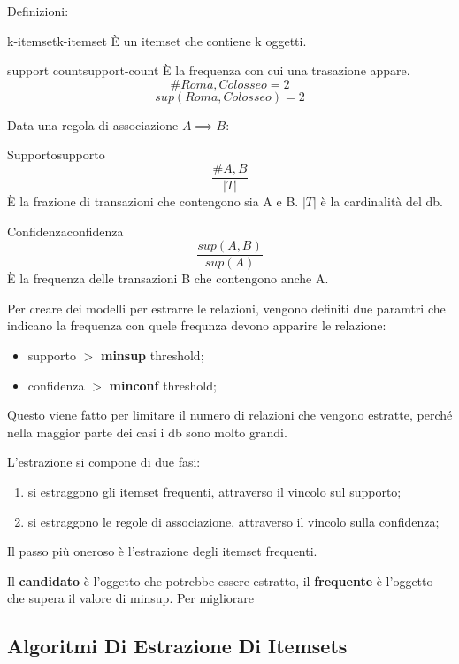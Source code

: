 \documentclass[12pt]{article}
\begin{document}
Definizioni:
\begin{definition}{k-itemset}{k-itemset}
    \`E un itemset che contiene k oggetti.
\end{definition}
\begin{definition}{support count}{support-count}
    \`E la frequenza con cui una trasazione appare.
    \[ \#{Roma, Colosseo} = 2 \]
    \[ sup(Roma, Colosseo) = 2 \]
\end{definition}

Data una regola di associazione $A \implies B$:
\begin{definition}{Supporto}{supporto}
    \[ \frac{\#{A,B}}{|T|} \]
    \`E la frazione di transazioni che contengono sia A e B. $|T|$ \`e la cardinalit\`a del db.
\end{definition}
\begin{definition}{Confidenza}{confidenza}
    \[ \frac{sup(A,B)}{sup(A)} \]
    \`E la frequenza delle transazioni B che contengono anche A.
\end{definition}

Per creare dei modelli per estrarre  le relazioni, vengono definiti due paramtri che indicano la frequenza con quele frequnza devono apparire le relazione:
\begin{itemize}
    \item supporto $>$ \textbf{minsup} threshold;
    \item confidenza $>$ \textbf{minconf} threshold;
\end{itemize}
Questo viene fatto  per limitare il numero di relazioni che vengono estratte, perch\'e nella maggior parte dei casi i db sono molto grandi.

L'estrazione si compone di due fasi:
\begin{enumerate}
    \item si estraggono gli itemset frequenti, attraverso il vincolo sul supporto;
    \item si estraggono le regole di associazione, attraverso il vincolo sulla confidenza;
\end{enumerate}
Il passo pi\`u oneroso \`e l'estrazione degli itemset frequenti.

Il \textbf{candidato} \`e l'oggetto che potrebbe essere estratto, il \textbf{frequente} \`e l'oggetto che supera il valore di minsup. Per migliorare 

\subsection{Algoritmi Di Estrazione Di Itemsets}
\end{document}
